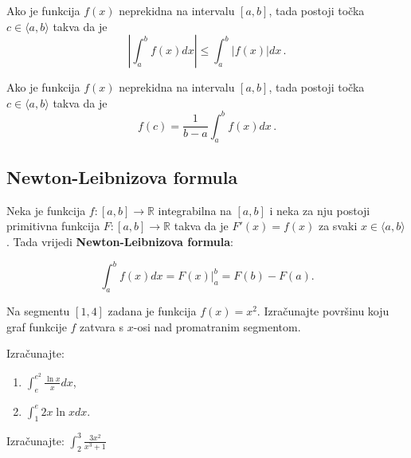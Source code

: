 \begin{proposition}
    Ako je funkcija $f(x)$ neprekidna na intervalu $[a, b]$, tada postoji točka $c \in \langle a, b\rangle$ takva da je
    $$
        \left|\int_a^b f(x)dx\right| \leq \int_a^b |f(x)|dx\,.
    $$
\end{proposition}

\begin{proposition}
    Ako je funkcija $f(x)$ neprekidna na intervalu $[a, b]$, tada postoji točka $c \in \langle a, b\rangle$ takva da je
    $$
        f(c) = \frac{1}{b-a}\int_a^b f(x)dx\,.
    $$
\end{proposition}

\subsection{Newton-Leibnizova formula}

Neka je funkcija $f: [a,b] \to \mathbb{R}$ integrabilna na $[a,b]$ i neka za nju postoji primitivna funkcija $F: [a,b] \to \mathbb{R}$ takva da je $F'(x)=f(x)$ za svaki $x\in \langle a, b \rangle$. Tada vrijedi \textbf{Newton-Leibnizova formula}:

$$
  \int_a^b f(x)dx=F(x)\Big|_a^b=F(b)-F(a).
$$

\begin{example}
    Na segmentu $[1,4]$ zadana je funkcija $f(x)=x^2$.
    Izračunajte površinu koju graf funkcije $f$ zatvara s $x$-osi nad promatranim segmentom.
\end{example}

\begin{example}
    Izračunajte:

    \begin{enumerate}
        \item $\displaystyle \int_e^{e^2} \frac{\ln x}{x} dx$,
        \item $\displaystyle \int_1^{e} 2x \ln x dx$.
    \end{enumerate}
\end{example}

\begin{example}
    Izračunajte: $\displaystyle \int_2^3 \frac{3x^2}{x^3+1}$
\end{example}
